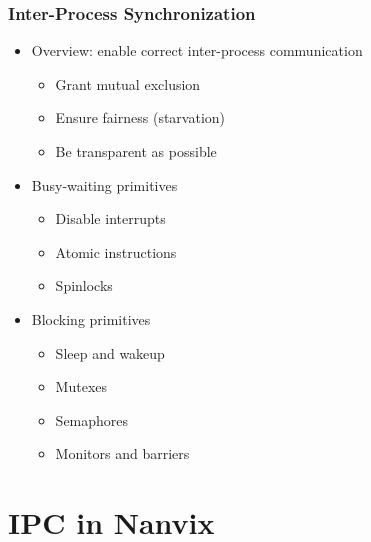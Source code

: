 \documentclass{beamer}
\begin{document}
	\begin{frame}
	\frametitle{Inter-Process Synchronization}
		\begin{itemize}
		\setlength\itemsep{0.8em}
			\item Overview: enable correct inter-process communication
			\begin{itemize}
			\setlength\itemsep{0.2em}
				\item Grant mutual exclusion
				\item Ensure fairness (starvation)
				\item Be transparent as possible
			\end{itemize}

			\item Busy-waiting primitives
			\begin{itemize}
			\setlength\itemsep{0.2em}
				\item Disable interrupts
				\item Atomic instructions
				\item Spinlocks
			\end{itemize}

			\item Blocking primitives
			\begin{itemize}
			\setlength\itemsep{0.2em}
				\item Sleep and wakeup
				\item Mutexes
				\item Semaphores
				\item Monitors and barriers
			\end{itemize}
		\end{itemize}
	\end{frame}

\section{IPC in Nanvix}
\end{document}
